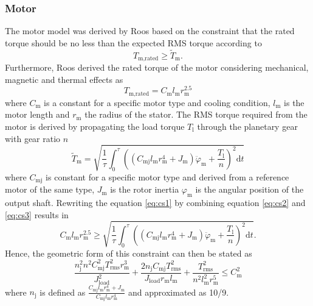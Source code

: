 \subsubsection*{Motor}
The motor model was derived by Roos\cite{roos2007} based on the constraint that the rated torque should be no less than the expected RMS torque according to
\begin{equation} \label{eq:cs1}
T_{\text{m,rated}} \geq \tilde{T}_{\text{m}}.
\end{equation}
Furthermore, Roos derived the rated torque of the motor considering mechanical, magnetic and thermal effects as
\begin{equation} \label{eq:cs2}
T_{\text{m,rated}}=C_{\text{m}}l_{\text{m}} r_{\text{m}}^{2.5}
\end{equation}
where $C_{\text{m}}$ is a constant for a specific motor type and cooling condition, $l_{\text{m}}$ is the motor length and $r_{\text{m}}$ the radius of the stator. The RMS torque required from the motor is derived by propagating the load torque $T_{\text{l}}$ through the planetary gear with gear ratio $n$
\begin{equation} \label{eq:cs3}
\tilde{T}_{\text{m}}=\sqrt{\frac{1}{\tau}\int_0^\tau ((C_{\text{mj}}l_{\text{m}} r_{\text{m}}^{4}+J_{\text{m}})\ddot{\varphi}_{\text{m}}+\frac{T_{\text{l}}}{n})^2  \mathrm{d} t}
\end{equation}
where $C_{\text{mj}}$ is constant for a specific motor type and derived from a reference motor of the same type, $J_{\text{m}}$ is the rotor inertia ${\varphi}_{\text{m}}$ is the angular position of the output shaft.
Rewriting the equation \ref{eq:cs1} by combining equation \ref{eq:cs2} and \ref{eq:cs3} results in
\begin{equation} \label{eq:cs4}
C_{\text{m}}l_{\text{m}} r_{\text{m}}^{2.5}\geq \sqrt{\frac{1}{\tau}\int_0^\tau ((C_{\text{mj}}l_{\text{m}} r_{\text{m}}^{4}+J_{\text{m}})\ddot{\varphi}_{\text{m}}+\frac{T_{\text{l}}}{n})^2  \mathrm{d} t}.
\end{equation}
Hence, the geometric form of this constraint can then be stated as
\begin{equation} \label{eq:cs5}
\frac{n_{\text{j}}^2 n^2 C_{\text{mj}}^2 T_{\text{rms}}^2 r_{\text{m}}^3}{J_{\text{load}}^2} + \frac{2 n_{\text{j}} C_{\text{mj}} T_{\text{rms}}^2}{J_{\text{load}} r_{\text{m}} l_{\text{m}}} + \frac{T_{\text{rms}}^2}{n^2 l_{\text{m}}^2 r_{\text{m}}^5}\leq C_{\text{m}}^2
\end{equation}
where $n_{\text{j}}$ is defined as $\frac{C_{\text{mj}}l_{\text{m}} r_{\text{m}}^{4}+J_{\text{m}}}{C_{\text{mj}}l_{\text{m}} r_{\text{m}}^{4}}$ and approximated as 10/9. 

